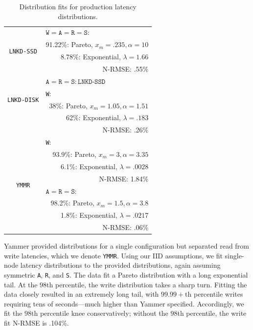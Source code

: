 \documentclass{vldb}
\begin{document}
\begin{table}
\centering
\begin{tabular}{|c|r|}
\hline
\multirow{4}{*}{\texttt{LNKD-SSD}} & \multicolumn{1}{|l|}{$\texttt{W} = \texttt{A}= \texttt{R} = \texttt{S}:$} \\
& 91.22\%: Pareto, $x_m=.235, \alpha=10$\\
& 8.78\%: Exponential, $\lambda = 1.66$ \\
& N-RMSE: .55\%\\\hline
\multirow{4}{*}{\texttt{LNKD-DISK}} & \multicolumn{1}{|l|}{$\texttt{A}= \texttt{R} = \texttt{S}: \texttt{LNKD-SSD}$}\\\cline{2-2}
& \multicolumn{1}{|l|}{\texttt{W}:}\\
& 38\%: Pareto, $x_m=1.05, \alpha=1.51$\\
& \hfill 62\%: Exponential, $\lambda = .183$ \\
& N-RMSE: .26\%\\
\hline
\multirow{8}{*}{\texttt{YMMR}} & \multicolumn{1}{|l|}{\texttt{W}:} \\
& 93.9\%: Pareto, $x_m=3, \alpha=3.35$\\
& 6.1\%: Exponential, $\lambda = .0028$ \\
& N-RMSE: 1.84\%\\\cline{2-2}
& \multicolumn{1}{|l|}{$\texttt{A}= \texttt{R} = \texttt{S}:$}\\
& 98.2\%: Pareto, $x_m=1.5, \alpha=3.8$\\
& 1.8\%: Exponential, $\lambda=.0217$\\
& N-RMSE: .06\%\\
\hline
\end{tabular}
\caption{Distribution fits for production latency distributions.}
\label{table:fits}
\end{table}


Yammer provided distributions for a single configuration but separated
read from write latencies, which we denote \texttt{YMMR}.  Using our
IID assumptions, we fit single-node latency distributions to the
provided distributions, again assuming symmetric \texttt{A},
\texttt{R}, and \texttt{S}.  The data fit a Pareto distribution with a
long exponential tail.  At the $98$th percentile, the write
distribution takes a sharp turn.  Fitting the data closely resulted in
an extremely long tail, with $99.99+$th percentile writes requiring
tens of seconds---much higher than Yammer specified.  Accordingly, we
fit the $98$th percentile knee conservatively; without the $98$th
percentile, the write fit N-RMSE is .104\%.
\end{document}
